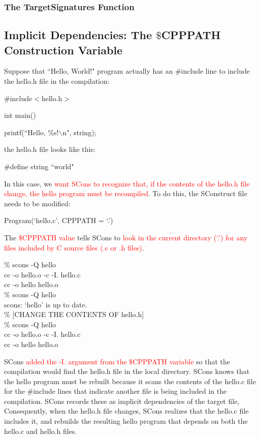 \documentclass[12pt,a4paper]{article}
\begin{document}
\subsubsection{The TargetSignatures Function}

\subsection{Implicit Dependencies: The $\$$CPPPATH Construction Variable}
Suppose that ``Hello, World!" program actually has an $\#$include line to include the hello.h file in the compilation:

$\#$include$<$hello.h$>$

int main(){

    printf(``Hello, $\%$s!$\backslash$n", string);

}

the hello.h file looks like this:

$\#$define string    ``world"

In this case, we \textcolor{red}{want SCons to recognize that, if the contents of the hello.h file change, the hello program must be recompiled}. To do this, the SConstruct file needs to be modified:

Program(`hello.c', CPPPATH = `.')

The \textcolor{red}{$\$$CPPPATH value} tells SCons to \textcolor{red}{look in the current directory (`.') for any files included by C source files (.c or .h files)}.

$\%$ scons -Q hello \\
cc -o hello.o -c -I. hello.c \\
cc -o hello hello.o \\
$\%$ scons -Q hello \\
scons: `hello' is up to date. \\
$\%$ [CHANGE THE CONTENTS OF hello.h] \\
$\%$ scons -Q hello \\
cc -o hello.o -c -I. hello.c \\
cc -o hello hello.o 

SCons \textcolor{red}{added the -I. argument from the $\$$CPPPATH variable} so that the compilation would find the hello.h file in the local directory. SCons knows that the hello program must be rebuilt because it scans the contents of the hello.c file for the $\#$include lines that indicate another file is being included in the compilation. SCons records these as implicit dependencies of the target file, Consequently, when the hello.h file changes, SCons realizes that the hello.c file includes it, and rebuilds the resulting hello program that depends on both the hello.c and hello.h files.
\end{document}
